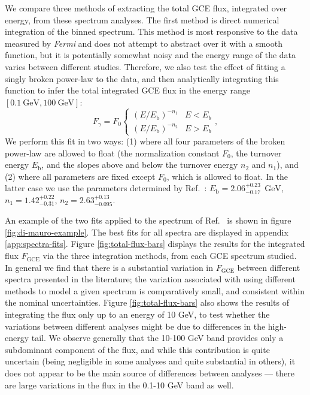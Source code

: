 \documentclass[letter,11pt]{article}
\newcommand{\parens}[1]{\left(#1\right)}
\newcommand{\fraci}[2]{#1 / #2}
\newcommand{\SIasym}[4]{#1^{+#2}_{-#3}\ \SI{}{#4}}%
\newcommand{\numasym}[3]{#1^{+#2}_{-#3}}%
\begin{document}
We compare three methods of extracting the total GCE flux, integrated over energy, from these spectrum analyses. The first method is direct numerical integration of the binned spectrum. This method is most responsive to the data measured by \textit{Fermi} and does not attempt to abstract over it with a smooth function, but it is potentially somewhat noisy and the energy range of the data varies between different studies. Therefore, we also test the effect of fitting a singly broken power-law to the data, and then analytically integrating this function to infer the total integrated GCE flux in the energy range $[\SI{0.1}{\giga\electronvolt}, \SI{100}{\giga\electronvolt}]$:
\begin{equation} F_\gamma = F_0 \begin{cases}
        \parens{\fraci{E}{E_\text{b}}}^{-n_{1}} & E < E_{b} \\
        \parens{\fraci{E}{E_\text{b}}}^{-n_{2}} & E > E_b
    \end{cases},\end{equation}
 We perform this fit in two ways: (1) where all four parameters of the broken power-law are allowed to float (the normalization constant $F_0$, the turnover energy $E_\text{b}$, and the slopes above and below the turnover energy $n_2$ and $n_1$), and (2) where all parameters are fixed except $F_0$, which is allowed to float. In the latter case we use the parameters determined by Ref.~\cite{Calore:2014xka}: $E_\text{b} = \SIasym{2.06}{0.23}{0.17}{\giga\electronvolt}$, $n_1 = \numasym{1.42}{0.22}{0.31}$, $n_2 = \numasym{2.63}{0.13}{0.095}$.

An example of the two fits applied to the spectrum of Ref.~\cite{DiMauro:2021raz} is shown in figure \ref{fig:di-mauro-example}. The best fits for all spectra are displayed in appendix \ref{app:spectra-fits}. Figure \ref{fig:total-flux-bars} displays the results for the integrated flux $F_\text{GCE}$ via the three integration methods, from each GCE spectrum studied. In general we find that there is a substantial variation in $F_\text{GCE}$ between different spectra presented in the literature; the variation associated with using different methods to model a given spectrum is comparatively small, and consistent within the nominal uncertainties. Figure \ref{fig:total-flux-bars} also shows the results of integrating the flux only up to an energy of 10 GeV, to test whether the variations between different analyses might be due to differences in the high-energy tail. We observe generally that the 10-100 GeV band provides only a subdominant component of the flux, and while this contribution is quite uncertain (being negligible in some analyses and quite substantial in others), it does not appear to be the main source of differences between analyses --- there are large variations in the flux in the 0.1-10 GeV band as well.
\end{document}
